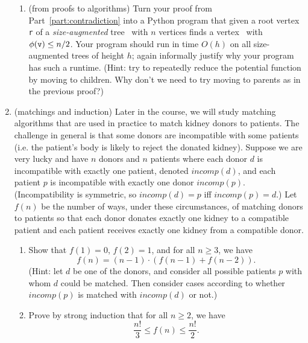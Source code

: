 \documentclass[11pt]{article}
\begin{document}
\begin{enumerate}
\begin{enumerate}
 \item (from proofs to algorithms)  Turn your proof from Part~\ref{part:contradiction} into a Python program that given a root vertex \texttt{r} of a {\em size-augmented} tree \treeT\ with $n$ vertices finds a vertex \btv\ with $\phi(\texttt{v})\leq n/2$. Your program should run in time $O(h)$ on all size-augmented trees of height $h$; again informally justify why your program has such a runtime. (Hint: try to repeatedly reduce the potential function by moving to children. Why don't we need to try moving to parents as in the previous proof?)
 \end{enumerate}
 
 \newcommand{\incomp}{\mathit{incomp}}
 \item (matchings and induction)
 Later in the course, we will study matching algorithms that are used in practice to match kidney donors to patients.  The challenge in general is that some donors are incompatible with some patients (i.e. the patient's body is likely to reject the donated kidney).  Suppose we are very lucky and have $n$ donors and $n$ patients where each donor $d$ is incompatible with exactly one patient, denoted $\incomp(d)$, and each patient $p$ is incompatible with exactly one donor $\incomp(p)$. (Incompatibility is symmetric, so $\incomp(d)=p$ iff $\incomp(p)=d$.)  Let $f(n)$ be the number of ways, under these circumstances, of matching donors to patients so that each donor donates exactly one kidney to a compatible patient and each patient receives exactly one kidney from a compatible donor.  
 \begin{enumerate} 
\item Show that $f(1)=0$, $f(2)=1$, and for all $n\geq 3$, we have
 $$ f(n) = (n-1)\cdot (f(n-1)+f(n-2)).$$
 (Hint: let $d$ be one of the donors, and consider all possible patients $p$ with whom $d$ could be matched.  Then consider cases according to whether $\incomp(p)$ is matched with $\incomp(d)$ or not.)

 \item Prove by strong induction that for all $n\geq 2$, we have
 $$\frac{n!}{3} \leq f(n) \leq \frac{n!}{2}.$$
 \end{enumerate}

\end{enumerate}
\end{document}
